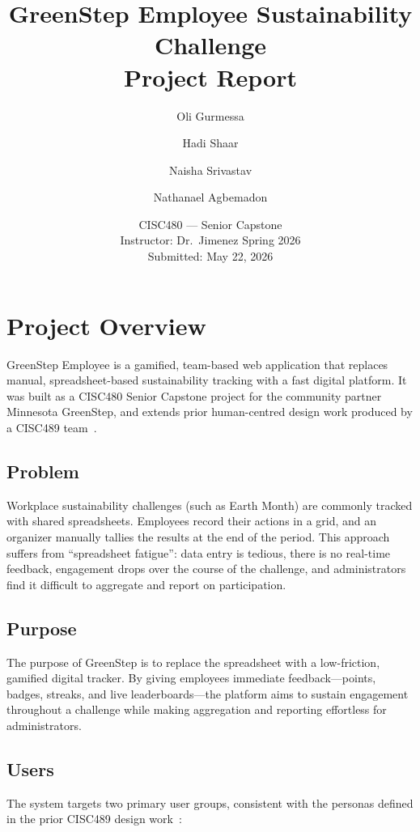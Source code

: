 \documentclass[12pt]{article}
\title{\textbf{GreenStep Employee Sustainability Challenge}\\[0.4em]
\large Project Report}
\author{Oli Gurmessa \and Hadi Shaar \and Naisha Srivastav \and Nathanael Agbemadon}
\date{CISC480 --- Senior Capstone\\[0.3em]
Instructor: Dr.\ Jimenez \quad\textbullet\quad Spring 2026\\[0.3em]
Submitted: May 22, 2026}
\begin{document}
\maketitle
\tableofcontents
\newpage

\section{Project Overview}

GreenStep Employee is a gamified, team-based web application that replaces
manual, spreadsheet-based sustainability tracking with a fast digital
platform. It was built as a CISC480 Senior Capstone project for the community
partner Minnesota GreenStep, and extends prior human-centred design work
produced by a CISC489 team~\cite{cisc489}.

\subsection{Problem}

Workplace sustainability challenges (such as Earth Month) are commonly tracked
with shared spreadsheets. Employees record their actions in a grid, and an
organizer manually tallies the results at the end of the period. This approach
suffers from ``spreadsheet fatigue'': data entry is tedious, there is no
real-time feedback, engagement drops over the course of the challenge, and
administrators find it difficult to aggregate and report on participation.

\subsection{Purpose}

The purpose of GreenStep is to replace the spreadsheet with a low-friction,
gamified digital tracker. By giving employees immediate feedback---points,
badges, streaks, and live leaderboards---the platform aims to sustain
engagement throughout a challenge while making aggregation and reporting
effortless for administrators.

\subsection{Users}

The system targets two primary user groups, consistent with the personas
defined in the prior CISC489 design work~\cite{cisc489}:
\end{document}
